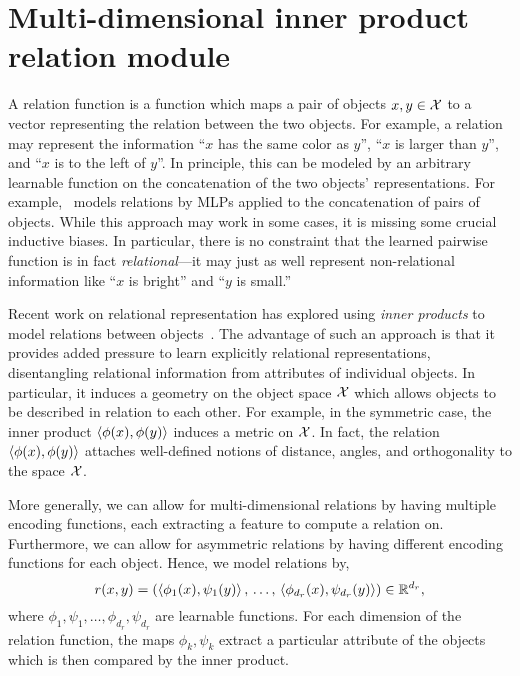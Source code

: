 \section{Multi-dimensional inner product relation module}\label{sec:mhr}


A relation function is a function which maps a pair of objects $x, y \in {\mathcal{X}}$ to a vector representing the relation between the two objects. For example, a relation may represent the information ``$x$ has the same color as $y$'', ``$x$ is larger than $y$'', and ``$x$ is to the left of $y$''. In principle, this can be modeled by an arbitrary learnable function on the concatenation of the two objects' representations. For example,~\citep{santoroSimpleNeural2017} models relations by MLPs applied to the concatenation of pairs of objects. While this approach may work in some cases, it is missing some crucial inductive biases. In particular, there is no constraint that the learned pairwise function is in fact \textit{relational}---it may just as well represent non-relational information like ``$x$ is bright'' and ``$y$ is small.''%

Recent work on relational representation has explored using \textit{inner products} to model relations between objects~\citep{webbEmergentSymbols2021, kergNeuralArchitecture2022, altabaaAbstractorsTransformer2023}. The advantage of such an approach is that it provides added pressure to learn explicitly relational representations, disentangling relational information from attributes of individual objects. In particular, it induces a geometry on the object space ${\mathcal{X}}$ which allows objects to be described in relation to each other. For example, in the symmetric case, the inner product $\left \langle \phi(x), \phi(y) \right\rangle$ induces a metric on ${\mathcal{X}}$. In fact, the relation $\left \langle \phi(x), \phi(y) \right\rangle$ attaches well-defined notions of distance, angles, and orthogonality to the space ${\mathcal{X}}$.

More generally, we can allow for multi-dimensional relations by having multiple encoding functions, each extracting a feature to compute a relation on. Furthermore, we can allow for asymmetric relations by having different encoding functions for each object. Hence, we model relations by,
\begin{equation}\label{eq:relation_function}
    r(x, y) = \left(
        \left \langle \phi_1(x), \psi_1(y) \right\rangle,\, \ldots,\, \left \langle \phi_{d_r}(x), \psi_{d_r}(y) \right\rangle\right) \in \mathbb{R}^{d_r},
\end{equation}
where $\phi_1, \psi_1, \ldots, \phi_{d_r}, \psi_{d_r}$ are learnable functions. For each dimension of the relation function, the maps $\phi_k, \psi_k$ extract a particular attribute of the objects which is then compared by the inner product.

